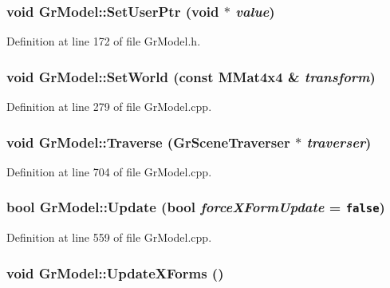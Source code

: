 \hypertarget{class_gr_model_7eb54cf62bdaf0cf4e32ef5628b54bc8}{
\subsubsection[{SetUserPtr}]{\setlength{\rightskip}{0pt plus 5cm}void GrModel::SetUserPtr (void $\ast$ {\em value})}}
\label{class_gr_model_7eb54cf62bdaf0cf4e32ef5628b54bc8}




Definition at line 172 of file GrModel.h.\hypertarget{class_gr_model_a3f1827d34de5f0c67d20103cf0d97bc}{
\subsubsection[{SetWorld}]{\setlength{\rightskip}{0pt plus 5cm}void GrModel::SetWorld (const {\bf MMat4x4} \& {\em transform})}}
\label{class_gr_model_a3f1827d34de5f0c67d20103cf0d97bc}




Definition at line 279 of file GrModel.cpp.\hypertarget{class_gr_model_89501566d6de6f63cda4527fb7cae760}{
\subsubsection[{Traverse}]{\setlength{\rightskip}{0pt plus 5cm}void GrModel::Traverse ({\bf GrSceneTraverser} $\ast$ {\em traverser})}}
\label{class_gr_model_89501566d6de6f63cda4527fb7cae760}




Definition at line 704 of file GrModel.cpp.\hypertarget{class_gr_model_dbb1580e4409efde8590f9a6feacd0c9}{
\subsubsection[{Update}]{\setlength{\rightskip}{0pt plus 5cm}bool GrModel::Update (bool {\em forceXFormUpdate} = {\tt false})}}
\label{class_gr_model_dbb1580e4409efde8590f9a6feacd0c9}




Definition at line 559 of file GrModel.cpp.\hypertarget{class_gr_model_fbc38dc0bd373a8b199535d55a06fc84}{
\subsubsection[{UpdateXForms}]{\setlength{\rightskip}{0pt plus 5cm}void GrModel::UpdateXForms ()}}
\label{class_gr_model_fbc38dc0bd373a8b199535d55a06fc84}




